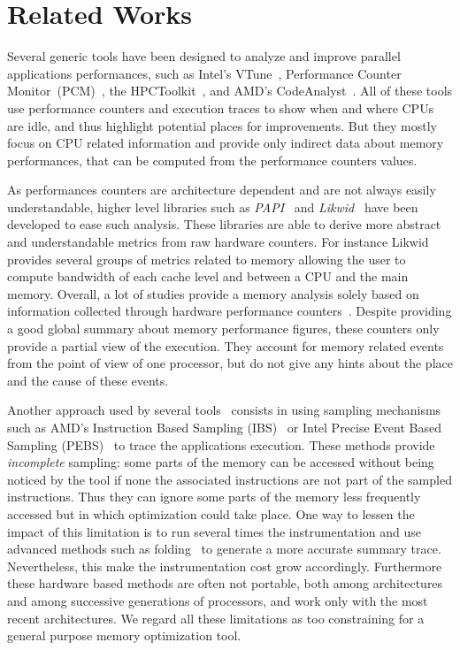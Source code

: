 
\section{Related Works}
\label{sec:related}

Several generic tools have been designed to analyze and improve parallel
applications performances, such as Intel's VTune~\cite{Reinders05VTune},
Performance Counter Monitor~(PCM)~\cite{Intel2012b}, the
HPCToolkit~\cite{Adhianto10HPCTOOLKIT}, and AMD's
CodeAnalyst~\cite{Drongowski2008}. All of these tools use performance
counters and execution traces to show when and where CPUs are idle, and thus
highlight potential places for improvements.
But they mostly focus on CPU related information and provide only
indirect data about memory performances, that can be computed from the performance counters values.

As performances counters are architecture dependent and are not always easily
understandable, higher level libraries such as \emph{PAPI}~\cite{Weaver13PAPI} and
\emph{Likwid}~\cite{Treibig10LIKWID} have been developed to ease such analysis. These
libraries are able to derive more abstract and understandable metrics from raw hardware counters.
For instance Likwid provides several groups of metrics related to memory
allowing the user to compute bandwidth of each cache level and between a CPU
and the main memory.
Overall, a lot of studies provide a memory analysis solely based
on information collected through hardware performance counters~\cite{Majo13(Mis)understanding,
Jiang14Understanding,Bosch00Rivet,Weyers14Visualization,Tao01Visualizing,DeRose01Hardware}.
Despite providing a good global summary about memory performance figures, these counters only provide a partial view of the execution. They
account for memory related events from the point of view of one processor, but do not give any hints about the place and the cause of these events.

Another approach used by several
tools~\cite{Lachaize12MemProf,McCurdy10Memphis,Liu14Tool,Gimenez14Dissecting}
consists in using sampling mechanisms such as AMD's Instruction Based Sampling
(IBS)~\cite{Drongowski07Instructionbased} or Intel Precise Event Based
Sampling (PEBS)~\cite{Levinthal2009} to trace the applications execution. These methods
provide \emph{incomplete} sampling: some parts of the memory can be accessed without
being noticed by the tool if none the associated instructions are not part of the sampled
instructions.
Thus they can ignore some parts of the memory less frequently accessed but in which
optimization could take place.
One way to lessen the impact of this limitation is to run several times the
instrumentation and use advanced methods such as
folding~\cite{Servat15Towards} to generate a more accurate summary trace.
Nevertheless, this make the instrumentation cost grow accordingly.
Furthermore
these hardware based methods are often not portable, both among architectures and
among successive generations of processors, and work only with the most
recent architectures.
We regard all these limitations as too constraining for a general purpose memory optimization tool.

